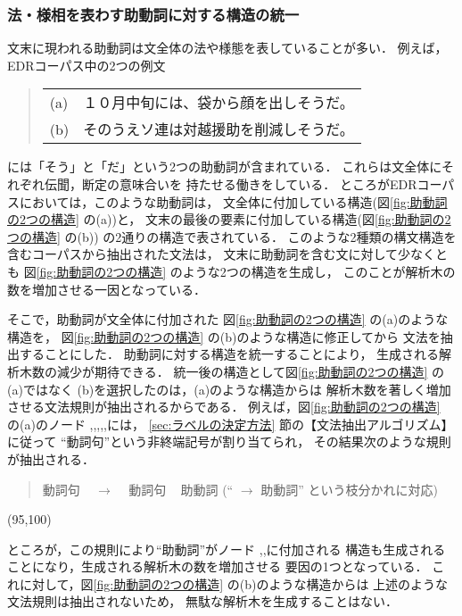 \subsubsection{法・様相を表わす助動詞に対する構造の統一}
\label{sec:助動詞に関する修正}

文末に現われる助動詞は文全体の法や様態を表していることが多い．
例えば，EDRコーパス中の2つの例文
\begin{quote}
  \smallskip
  \begin{tabular}{ll}
    (a) & １０月中旬には、袋から顔を出しそうだ。 \\
    (b) & そのうえソ連は対越援助を削減しそうだ。 \\
  \end{tabular}
  \smallskip
\end{quote}
には「そう」と「だ」という2つの助動詞が含まれている．
これらは文全体にそれぞれ伝聞，断定の意味合いを
持たせる働きをしている．
ところがEDRコーパスにおいては，このような助動詞は，
文全体に付加している構造(図\ref{fig:助動詞の2つの構造} の(a))と，
文末の最後の要素に付加している構造(図\ref{fig:助動詞の2つの構造} の(b))
の2通りの構造で表されている．
このような2種類の構文構造を含むコーパスから抽出された文法は，
文末に助動詞を含む文に対して少なくとも
図\ref{fig:助動詞の2つの構造} のような2つの構造を生成し，
このことが解析木の数を増加させる一因となっている．


そこで，助動詞が文全体に付加された
図\ref{fig:助動詞の2つの構造} の(a)のような構造を，
図\ref{fig:助動詞の2つの構造} の(b)のような構造に修正してから
文法を抽出することにした．
助動詞に対する構造を統一することにより，
生成される解析木数の減少が期待できる．
統一後の構造として図\ref{fig:助動詞の2つの構造} の(a)ではなく
(b)を選択したのは，(a)のような構造からは
解析木数を著しく増加させる文法規則が抽出されるからである．
例えば，図\ref{fig:助動詞の2つの構造} の(a)のノード
,,,,,には，
\ref{sec:ラベルの決定方法} 節の【文法抽出アルゴリズム】に従って
``動詞句''という非終端記号が割り当てられ，
その結果次のような規則が抽出される．
\begin{quote}
  動詞句 ~ $\rightarrow$ ~ 動詞句 ~ 助動詞  \qquad
  (`` $\rightarrow$  助動詞'' という枝分かれに対応)
\end{quote}

\begin{center}
  \atari(95,100)
\end{center}

\noindent
ところが，この規則により``助動詞''がノード
,,に付加される
構造も生成されることになり，生成される解析木の数を増加させる
要因の1つとなっている．
これに対して，図\ref{fig:助動詞の2つの構造} の(b)のような構造からは
上述のような文法規則は抽出されないため，
無駄な解析木を生成することはない．
\vspace{-1mm}
